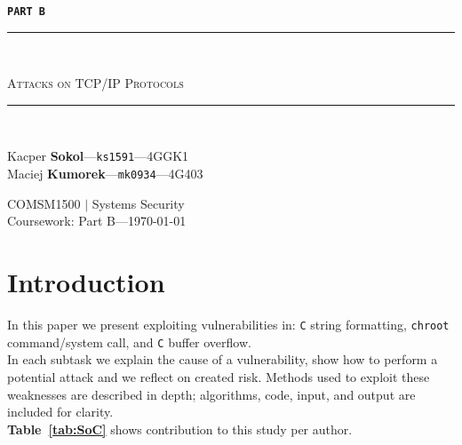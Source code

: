 \documentclass[12pt, a4paper, pdflatex]{article}
\newcommand{\HRule}{\rule{\linewidth}{0.5mm}}
\begin{document}

\begin{center}
\vspace*{\fill}
  \Huge
 \texttt{\textbf{PART B}}

\end{center}


\begin{center}
    \begin{large}
    {\HRule \\[0.2cm]}
    \textsc{Attacks on TCP/IP Protocols}
    {\HRule \\[0.3cm]}
    \end{large}

    \begin{minipage}{ 0.49\textwidth }
        \begin{flushleft}
            Kacper \textbf{Sokol}---\texttt{ks1591}---4GGK1\\
            Maciej \textbf{Kumorek}---\texttt{mk0934}---4G403\\
        \end{flushleft}
    \end{minipage}
    \begin{minipage}{ 0.49\textwidth }
        \begin{flushright}
            {COMSM1500 $|$ Systems Security\\
            Coursework: Part B---\today\\[0.3cm]}
        \end{flushright}
    \end{minipage}
\end{center}
\vspace*{\fill}

\thispagestyle{empty}
\newpage
\setcounter{page}{1}

\section{Introduction}
In this paper we present exploiting vulnerabilities in: \texttt{C} string formatting, \texttt{chroot} command/system call, and \texttt{C} buffer overflow.\\
In each subtask we explain the cause of a vulnerability, show how to perform a potential attack and we reflect on created risk. Methods used to exploit these weaknesses are described in depth; algorithms, code, input, and output are included for clarity.\\
\textbf{Table~\ref{tab:SoC}} shows contribution to this study per author.
\end{document}
